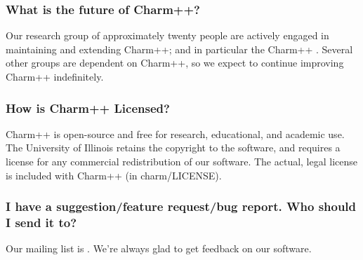 \subsubsection{What is the future of Charm++?}

Our research group of approximately twenty people are actively engaged
in maintaining and extending Charm++; and in particular the Charm++ 
.
Several other groups are dependent on Charm++, so we expect to continue
improving Charm++ indefinitely.

\subsubsection{How is Charm++ Licensed?}

Charm++ is open-source and free for research, educational, and academic
use. The University of Illinois retains the copyright to the software,
and requires a license for any commercial redistribution of our software.
The actual, legal license is included with Charm++ (in charm/LICENSE).

\subsubsection{I have a suggestion/feature request/bug report. Who should I send
it to?}

Our mailing list is .
We're always glad to get feedback on our software.
